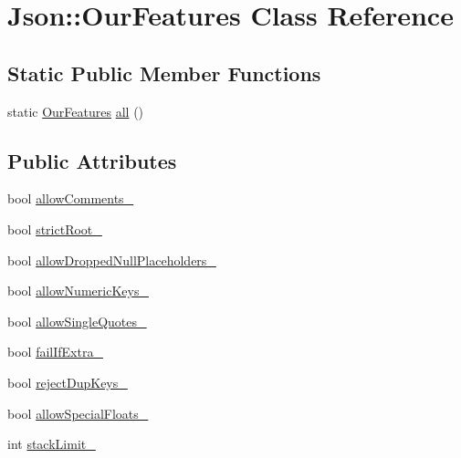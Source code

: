\hypertarget{class_json_1_1_our_features}{}\section{Json\+:\+:Our\+Features Class Reference}
\label{class_json_1_1_our_features}
\subsection*{Static Public Member Functions}
\begin{DoxyCompactItemize}
\item 
static \hyperlink{class_json_1_1_our_features}{Our\+Features} \hyperlink{class_json_1_1_our_features_a0686e1406b6677f496529f9f3fe98d1e}{all} ()
\end{DoxyCompactItemize}
\subsection*{Public Attributes}
\begin{DoxyCompactItemize}
\item 
bool \hyperlink{class_json_1_1_our_features_ac71bb7ba7363d3b05ed76602b036ce33}{allow\+Comments\+\_\+}
\item 
bool \hyperlink{class_json_1_1_our_features_a2095f66a776c0a4ae6cc931a0c94242e}{strict\+Root\+\_\+}
\item 
bool \hyperlink{class_json_1_1_our_features_a13963bc44bf948eec1968f7ff8e8f5f1}{allow\+Dropped\+Null\+Placeholders\+\_\+}
\item 
bool \hyperlink{class_json_1_1_our_features_af6973fc7e774ce2d634ba99442aeb91a}{allow\+Numeric\+Keys\+\_\+}
\item 
bool \hyperlink{class_json_1_1_our_features_abbd6c196d7a22e2a360a59887eda4610}{allow\+Single\+Quotes\+\_\+}
\item 
bool \hyperlink{class_json_1_1_our_features_ae8ad25b90706c78f1a8fe929191ac61b}{fail\+If\+Extra\+\_\+}
\item 
bool \hyperlink{class_json_1_1_our_features_a39b8e0b86b1c24a45e800c023bb715aa}{reject\+Dup\+Keys\+\_\+}
\item 
bool \hyperlink{class_json_1_1_our_features_af760f91cc2a7af37e44f78fb466061bb}{allow\+Special\+Floats\+\_\+}
\item 
int \hyperlink{class_json_1_1_our_features_a9a786713902d14be6d57a08cc03ccfff}{stack\+Limit\+\_\+}
\end{DoxyCompactItemize}


